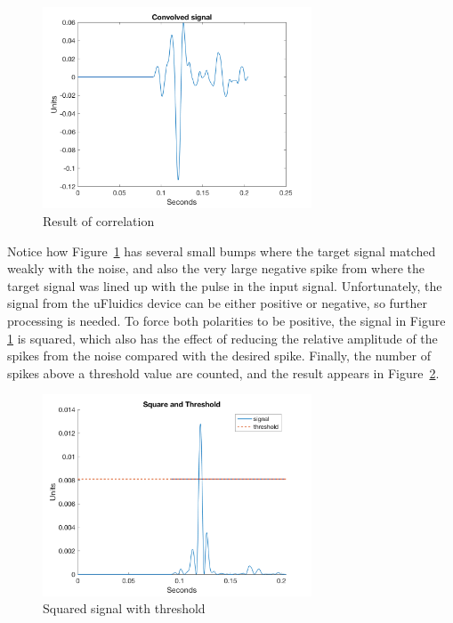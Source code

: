 \documentclass[10pt, journal]{IEEEtran}
\begin{document}
\begin{figure}[h]
  \includegraphics[width=8cm]{../matlab/plot3.png}
  \caption{Result of correlation}
  \label{fig:correl}
\end{figure}

Notice how Figure \,\ref{fig:correl} has several small bumps where the
target signal matched weakly with the noise, and also the very large
negative spike from where the target signal was lined up with the
pulse in the input signal. Unfortunately, the signal from the
uFluidics device can be either positive or negative, so further
processing is needed. To force both polarities to be positive, the
signal in Figure \,\ref{fig:correl} is squared, which also has the
effect of reducing the relative amplitude of the spikes from the noise
compared with the desired spike. Finally, the number of spikes above a
threshold value are counted, and the result appears in Figure
\,\ref{fig:result}.

\begin{figure}[h]
  \includegraphics[width=8cm]{../matlab/plot4.png}
  \caption{Squared signal with threshold}
  \label{fig:result}
\end{figure}


\newpage
 {}
\end{document}
